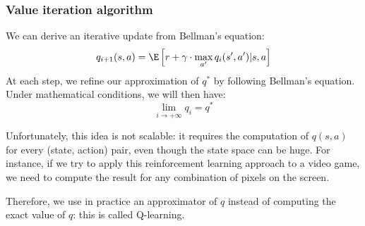 \subsubsection{Value iteration algorithm}
We can derive an iterative update from Bellman's equation:
\begin{equation*}
    q_{i+1}(s,a) = \E\left[r+\gamma\cdot\max_{a'}q_i(s',a')|s,a\right]
\end{equation*}
At each step, we refine our approximation of $q^*$ by following Bellman's equation. Under mathematical conditions, we will then have:
\begin{equation*}
    \lim_{i\to+\infty}q_i = q^*
\end{equation*}

Unfortunately, this idea is not scalable: it requires the computation of $q(s,a)$ for every (state, action) pair, even though the state space can be huge. For instance, if we try to apply this reinforcement learning approach to a video game, we need to compute the result for any combination of pixels on the screen.

Therefore, we use in practice an approximator of $q$ instead of computing the exact value of $q$: this is called Q-learning. 
\newpage